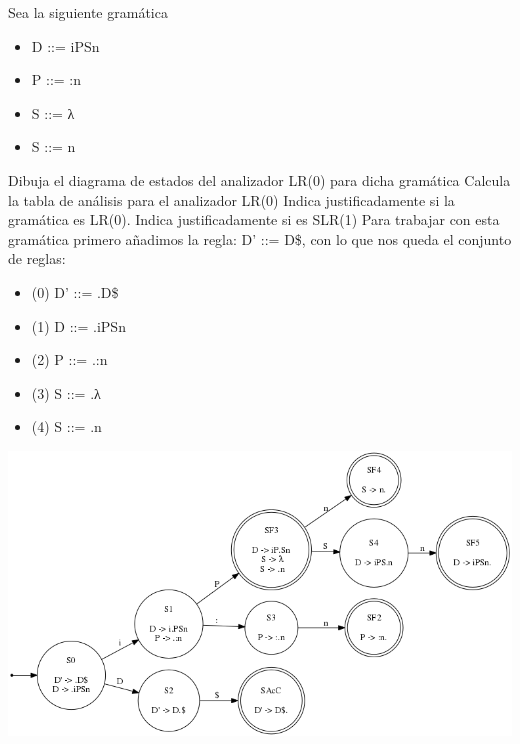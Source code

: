 \documentclass[nochap]{apuntes}
\begin{document}
\begin{problem}
Sea la siguiente gramática

\begin{itemize}
\item D ::= iPSn
\item P ::= :n
\item S ::= λ
\item S ::= n
\end{itemize}

\ppart Dibuja el diagrama de estados del analizador LR(0) para dicha gramática
\ppart Calcula la tabla de análisis para el analizador LR(0)
\ppart Indica justificadamente si la gramática es LR(0). Indica justificadamente si es SLR(1)
\solution
Para trabajar con esta gramática primero añadimos la regla: D' ::= D\$, con lo que nos queda el conjunto de reglas:
\begin{itemize}
\item (0) D' ::= .D\$
\item (1) D ::= .iPSn
\item (2) P ::= .:n
\item (3) S ::= .λ
\item (4) S ::= .n
\end{itemize}
\ppart
\begin{center}
\includegraphics[scale=0.65]{automata_H3E4.png}
\end{center}


\end{problem}
\end{document}
